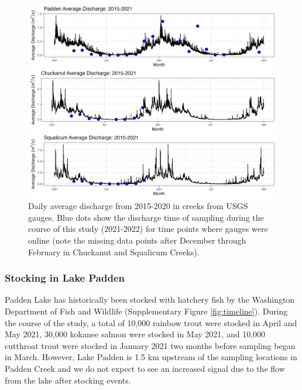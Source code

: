\documentclass[
]{article}
\begin{document}
\begin{figure}
\centering
\includegraphics{../Output/SupplementalFigures/historical_flow_year_avg_sampling.png}
\caption{Daily average discharge from 2015-2020 in creeks from USGS
gauges. Blue dots show the discharge time of sampling during the course
of this study (2021-2022) for time points where gauges were online (note
the missing data points after December through February in Chuckanut and
Squalicum Creeks).\label{fig:dischargesupp}}
\end{figure}

\hypertarget{stocking-in-lake-padden}{%
\subsubsection{Stocking in Lake Padden}\label{stocking-in-lake-padden}}

Padden Lake has historically been stocked with hatchery fish by the
Washington Department of Fish and Wildlife (Supplementary Figure
\ref{fig:timeline}). During the course of the study, a total of 10,000
rainbow trout were stocked in April and May 2021, 30,000 kokanee salmon
were stocked in May 2021, and 10,000 cutthroat trout were stocked in
January 2021 two months before sampling began in March. However, Lake
Padden is 1.5 km upstream of the sampling locations in Padden Creek and
we do not expect to see an increased signal due to the flow from the
lake after stocking events.
\end{document}
